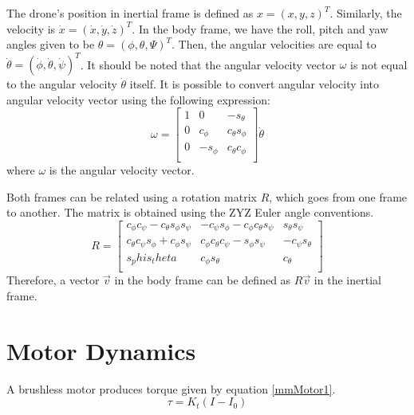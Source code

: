 The drone's position in inertial frame is defined as $x = (x,y,z)^T$. Similarly, the velocity is $\dot{x} = (\dot{x},\dot{y},\dot{z})^T$. In the body frame, we have the roll, pitch and yaw angles given to be $\theta = (\phi,\theta,\Psi)^T$. Then, the angular velocities are equal to $\dot{\theta} = (\dot{\phi},\dot{\theta},\dot{\psi})^T$.
It should be noted that the angular velocity vector $\omega$ is not equal to the angular velocity $\dot{\theta}$ itself. It is possible to convert angular velocity into angular velocity vector using the following expression:
\begin{equation}
\label{mmKinematics1}
\omega = \begin{bmatrix}
       	1		& 0 		& -s_\theta			\\
       	0 		& c_\phi 	& c_\theta s_\phi 	\\
      	0       & -s_\phi 	& c_\theta c_\phi 	\\
\end{bmatrix} \dot{\theta}
\end{equation}
where $\omega$ is the angular velocity vector.

Both frames can be related using a rotation matrix $R$, which goes from one frame to another. The matrix is obtained using the ZYZ Euler angle conventions.
\begin{equation}
\label{mmKinematics2}
R = \begin{bmatrix}
       	c_\phi c_\psi - c_\theta s_\phi s_\psi		& -c_\psi s_\phi - c_\phi c_\theta s_\psi 	& s_\theta s_\psi			\\
       	c_\theta c_\psi s_\phi + c_\phi s_\psi 		& c_\phi c_\theta c_\psi - s_\phi s_\psi 	& -c_\psi s_\theta 			\\
      	s_phi s_theta       						& c_\phi s_\theta 								& c_\theta 					\\
\end{bmatrix}
\end{equation}
Therefore, a vector $\overrightarrow{v}$ in the body frame can be defined as $R\overrightarrow{v}$ in the inertial frame.

\section{Motor Dynamics}
A brushless motor produces torque given by equation \ref{mmMotor1}.
\begin{equation}
\label{mmMotor1}
	\tau = K_t(I-I_0)
\end{equation}

